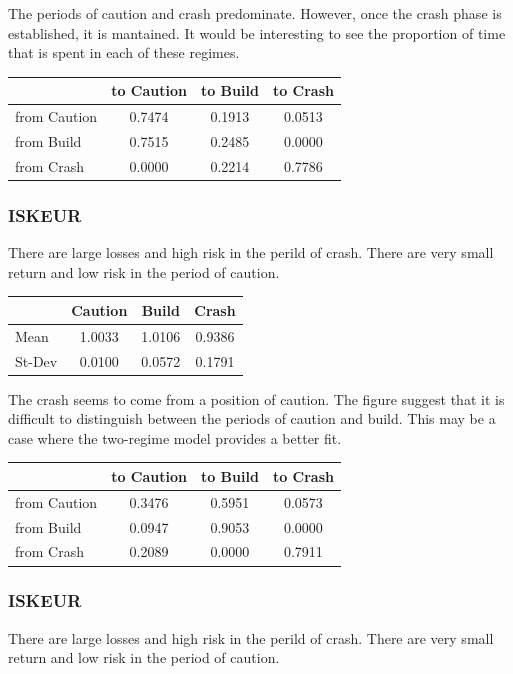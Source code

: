 \documentclass[12pt, a4paper, oneside]{article} %
\begin{document}
The periods of caution and crash predominate. However, once the crash phase is established, it is mantained.  It would be interesting to see the proportion of time that is spent in each of these regimes.  

 \begin{centering}
 \begin{tabular}{l c c c}
 & to Caution & to Build & to Crash\\
 \hline
 from Caution & 0.7474 & 0.1913 & 0.0513\\
 from Build & 0.7515 & 0.2485 & 0.0000\\
 from Crash & 0.0000 & 0.2214 & 0.7786
 \end{tabular}
 \end{centering}

\subsubsection{ISKEUR}
There are large losses and high risk in the perild of crash.  There are very small return and low risk in the period of caution. 


\begin{centering}
 \begin{tabular}{l c c c}
 & Caution & Build & Crash \\
 \hline
 Mean & 1.0033 & 1.0106 & 0.9386\\
 St-Dev & 0.0100 & 0.0572 & 0.1791\\
 \end{tabular}
 \end{centering}

The crash seems to come from a position of caution.  The figure suggest that it is difficult to distinguish between the periods of caution and build.  This may be a case where the two-regime model provides a better fit. 

 \begin{centering}
 \begin{tabular}{l c c c}
 & to Caution & to Build & to Crash\\
 \hline
 from Caution & 0.3476 & 0.5951 & 0.0573\\
 from Build & 0.0947 & 0.9053 & 0.0000\\
 from Crash & 0.2089 & 0.0000 & 0.7911
 \end{tabular}
 \end{centering}

\subsubsection{ISKEUR}
There are large losses and high risk in the perild of crash.  There are very small return and low risk in the period of caution. 
\end{document}
